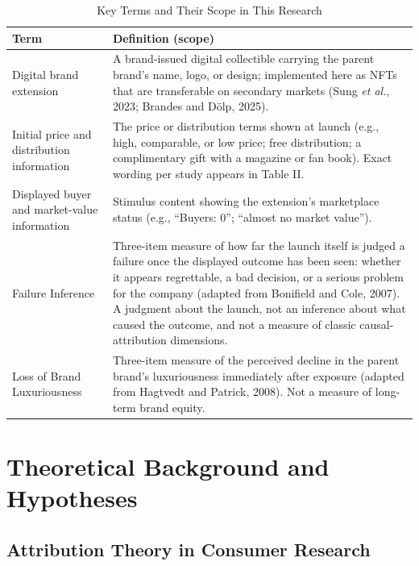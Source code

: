 \documentclass[12pt, a4paper]{article}
\renewcommand{\arraystretch}{1.6}
\begin{document}
\begin{table}[H]
\centering
\caption{Key Terms and Their Scope in This Research}
\begingroup
\doublespacing
\renewcommand{\arraystretch}{1.0}
\begin{tabular}{@{}
  >{\raggedright\arraybackslash}p{}
  >{\raggedright\arraybackslash}p{}@{}}
\toprule
\textbf{Term} & \textbf{Definition (scope)} \\
\midrule
Digital brand extension & A brand-issued digital collectible carrying the parent brand's name, logo, or design; implemented here as NFTs that are transferable on secondary markets (Sung \emph{et al.}, 2023; Brandes and D\"olp, 2025). \\
Initial price and distribution information & The price or distribution terms shown at launch (e.g., high, comparable, or low price; free distribution; a complimentary gift with a magazine or fan book). Exact wording per study appears in Table II. \\
Displayed buyer and market-value information & Stimulus content showing the extension's marketplace status (e.g., ``Buyers: 0''; ``almost no market value''). \\
Failure Inference & Three-item measure of how far the launch itself is judged a failure once the displayed outcome has been seen: whether it appears regrettable, a bad decision, or a serious problem for the company (adapted from Bonifield and Cole, 2007). A judgment about the launch, not an inference about what caused the outcome, and not a measure of classic causal-attribution dimensions. \\
Loss of Brand Luxuriousness & Three-item measure of the perceived decline in the parent brand's luxuriousness immediately after exposure (adapted from Hagtvedt and Patrick, 2008). Not a measure of long-term brand equity. \\
\bottomrule
\end{tabular}
\endgroup
\end{table}

\section{Theoretical Background and Hypotheses}

\subsection{Attribution Theory in Consumer Research}
\end{document}
